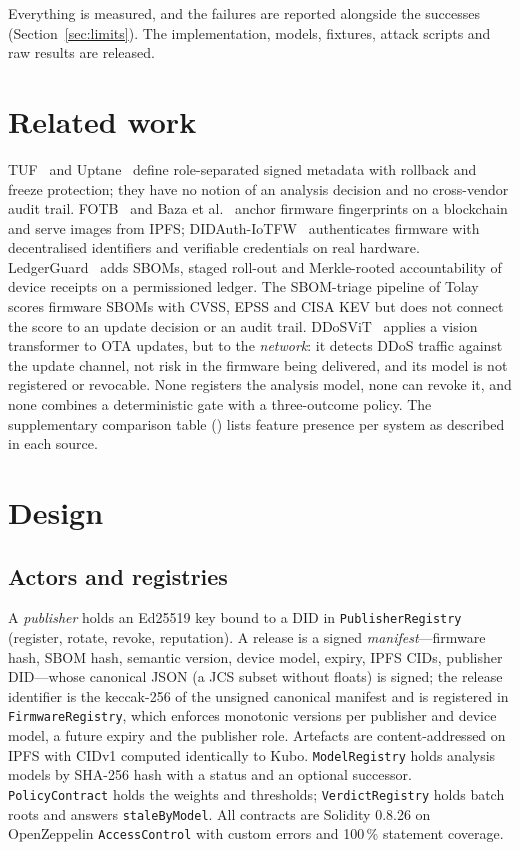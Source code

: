 \documentclass[conference]{IEEEtran}
\newcommand{\res}[1]{{\small\path{#1}}}  %
\begin{document}
Everything is measured, and the failures are reported alongside the successes
(Section~\ref{sec:limits}). The implementation, models, fixtures, attack scripts and raw results
are released.

\section{Related work}
\label{sec:related}
TUF~\cite{tuf} and Uptane~\cite{uptane} define role-separated signed metadata with rollback and
freeze protection; they have no notion of an analysis decision and no cross-vendor audit trail.
FOTB~\cite{fotb} and Baza et al.~\cite{baza} anchor firmware fingerprints on a blockchain and
serve images from IPFS; DIDAuth-IoTFW~\cite{didauth} authenticates firmware with decentralised
identifiers and verifiable credentials on real hardware. LedgerGuard~\cite{ledgerguard} adds
SBOMs, staged roll-out and Merkle-rooted accountability of device receipts on a permissioned
ledger. The SBOM-triage pipeline of Tolay~\cite{sbomtriage} scores firmware SBOMs with CVSS,
EPSS and CISA KEV but does not connect the score to an update decision or an audit trail.
DDoSViT~\cite{ddosvit} applies a vision transformer to OTA updates, but to the \emph{network}:
it detects DDoS traffic against the update channel, not risk in the firmware being delivered,
and its model is not registered or revocable. None registers the analysis model, none can revoke it, and none combines a deterministic gate with a
three-outcome policy. The supplementary comparison table (\res{docs/comparison.md})
lists feature presence per system as described in each source.

\section{Design}
\label{sec:design}

\subsection{Actors and registries}
A \emph{publisher} holds an Ed25519 key bound to a DID in \texttt{PublisherRegistry} (register,
rotate, revoke, reputation). A release is a signed \emph{manifest}---firmware hash, SBOM hash,
semantic version, device model, expiry, IPFS CIDs, publisher DID---whose canonical JSON (a JCS
subset without floats) is signed; the release identifier is the keccak-256 of the unsigned
canonical manifest and is registered in \texttt{FirmwareRegistry}, which enforces monotonic
versions per publisher and device model, a future expiry and the publisher role. Artefacts are
content-addressed on IPFS with CIDv1 computed identically to Kubo. \texttt{ModelRegistry} holds
analysis models by SHA-256 hash with a status and an optional successor.
\texttt{PolicyContract} holds the weights and thresholds; \texttt{VerdictRegistry} holds batch
roots and answers \texttt{staleByModel}. All contracts are Solidity 0.8.26 on OpenZeppelin
\texttt{AccessControl} with custom errors and 100\,\% statement coverage.
\end{document}
